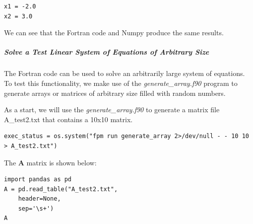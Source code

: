 \begin{verbatim}
x1 = -2.0
x2 = 3.0
\end{verbatim}

We can see that the Fortran code and Numpy produce the same results.

\subparagraph{Solve a Test Linear System of Equations of Arbitrary Size}

The Fortran code can be used to solve an arbitrarily large system of equations.  To test this functionality, we make use of the \textit{generate\_array.f90} program to generate arrays or matrices of arbitrary size filled with random numbers.

As a start, we will use the \textit{generate\_array.f90} to generate a matrix file A\_test2.txt that contains a 10x10 matrix.

\begin{verbatim}
exec_status = os.system("fpm run generate_array 2>/dev/null - - 10 10 > A_test2.txt")
\end{verbatim}

The $\mathbf{A}$ matrix is shown below:

\begin{verbatim}
import pandas as pd
A = pd.read_table("A_test2.txt", 
    header=None, 
    sep='\s+')
A
\end{verbatim}

